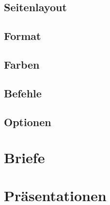 \documentclass[a4paper,11pt]{tubsreprt}
\begin{document}
\section{Seitenlayout}



\section{Format}

\section{Farben}

\section{Befehle}

\section{Optionen}


\chapter{Briefe}


\chapter{Präsentationen}
\end{document}
